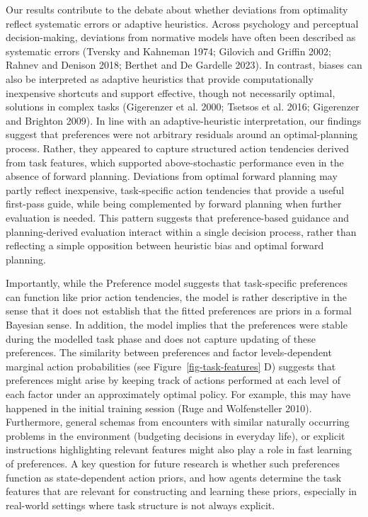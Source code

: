 \documentclass[
  letterpaper,
  DIV=11,
  numbers=noendperiod]{scrartcl}
\begin{document}
Our results contribute to the debate about whether deviations from
optimality reflect systematic errors or adaptive heuristics. Across
psychology and perceptual decision-making, deviations from normative
models have often been described as systematic errors (Tversky and
Kahneman 1974; Gilovich and Griffin 2002; Rahnev and Denison 2018;
Berthet and De Gardelle 2023). In contrast, biases can also be
interpreted as adaptive heuristics that provide computationally
inexpensive shortcuts and support effective, though not necessarily
optimal, solutions in complex tasks ({Gigerenzer et al.} 2000; Tsetsos
et al. 2016; Gigerenzer and Brighton 2009). In line with an
adaptive-heuristic interpretation, our findings suggest that preferences
were not arbitrary residuals around an optimal-planning process. Rather,
they appeared to capture structured action tendencies derived from task
features, which supported above-stochastic performance even in the
absence of forward planning. Deviations from optimal forward planning
may partly reflect inexpensive, task-specific action tendencies that
provide a useful first-pass guide, while being complemented by forward
planning when further evaluation is needed. This pattern suggests that
preference-based guidance and planning-derived evaluation interact
within a single decision process, rather than reflecting a simple
opposition between heuristic bias and optimal forward planning.

Importantly, while the Preference model suggests that task-specific
preferences can function like prior action tendencies, the model is
rather descriptive in the sense that it does not establish that the
fitted preferences are priors in a formal Bayesian sense. In addition,
the model implies that the preferences were stable during the modelled
task phase and does not capture updating of these preferences. The
similarity between preferences and factor levels-dependent marginal
action probabilities (see Figure~\ref{fig-task-features} D) suggests
that preferences might arise by keeping track of actions performed at
each level of each factor under an approximately optimal policy. For
example, this may have happened in the initial training session (Ruge
and Wolfensteller 2010). Furthermore, general schemas from encounters
with similar naturally occurring problems in the environment (budgeting
decisions in everyday life), or explicit instructions highlighting
relevant features might also play a role in fast learning of
preferences. A key question for future research is whether such
preferences function as state-dependent action priors, and how agents
determine the task features that are relevant for constructing and
learning these priors, especially in real-world settings where task
structure is not always explicit.
\end{document}
